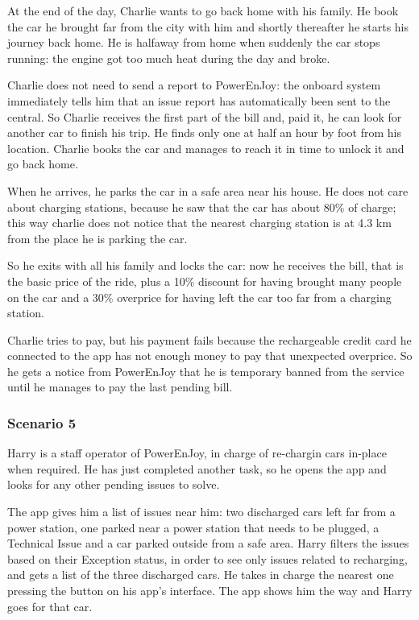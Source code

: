 \documentclass[11pt]{article} %
\newcommand{\pe}{PowerEnJoy }
\newcommand{\pecomma}{PowerEnJoy, }
\begin{document}
At the end of the day, Charlie wants to go back home with his family. He book the car he brought far from the city with him and shortly thereafter he starts his journey back home. He is halfaway from home when suddenly the car stops running: the engine got too much heat during the day and broke.

Charlie does not need to send a report to PowerEnJoy: the onboard system immediately tells him that an issue report has automatically been sent to the central. So Charlie receives the first part of the bill and, paid it, he can look for another car to finish his trip. He finds only one at half an hour by foot from his location. Charlie books the car and manages to reach it in time to unlock it and go back home.

When he arrives, he parks the car in a safe area near his house. He does not care about charging stations, because he saw that the car has about 80\% of charge; this way charlie does not notice that the nearest charging station is at 4.3 km from the place he is parking the car. 

So he exits with all his family and locks the car: now he receives the bill, that is the basic price of the ride, plus a 10\% discount for having brought many people on the car and a 30\% overprice for having left the car too far from a charging station.

Charlie tries to pay, but his payment fails because the rechargeable credit card he connected to the app has not enough money to pay that unexpected overprice. So he gets a notice from \pe that he is temporary banned from the service until he manages to pay the last pending bill.

\subsubsection{Scenario 5}
Harry is a staff operator of \pecomma in charge of re-chargin cars in-place when required. He has just completed another task, so he opens the app and looks for any other pending issues to solve.

The app gives him a list of issues near him: two discharged cars left far from a power station, one parked near a power station that needs to be plugged, a Technical Issue and a car parked outside from a safe area. Harry filters the issues based on their Exception status, in order to see only issues related to recharging, and gets a list of the three discharged cars. He takes in charge the nearest one pressing the button on his app's interface. The app shows him the way and Harry goes for that car.
\end{document}
